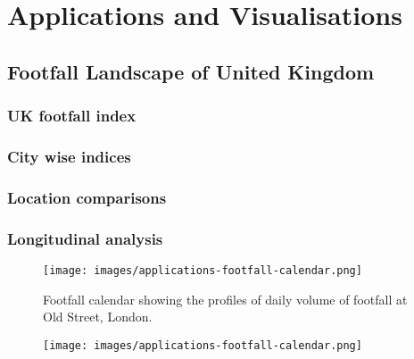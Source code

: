 \chapter{Applications and Visualisations} \label{chapter:application}

\lipsum[1-2]

\section{Footfall Landscape of United Kingdom}
\lipsum[3]
\subsection{UK footfall index}
\lipsum[1]

\subsection{City wise indices}
\lipsum[1]

\subsection{Location comparisons}
\lipsum[1]

\subsection{Longitudinal analysis}
\lipsum[1]

\lipsum[1-2]

\cleartoleftpage
{}
\begin{figure*}
  \forceversofloat
  \texttt{[image: images/applications-footfall-calendar.png]}
  \caption{Footfall calendar showing the profiles of daily volume of footfall at Old Street, London.}
  \label{}
\end{figure*}
\clearpage
\begin{figure*}
  \forcerectofloat
  \texttt{[image: images/applications-footfall-calendar.png]}
  \caption[]{}
  \label{}
\end{figure*}
\restoregeometry
\clearpage

